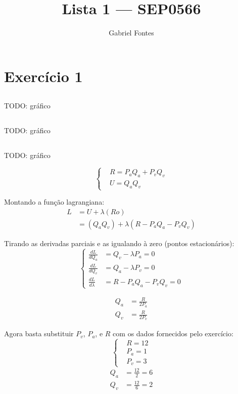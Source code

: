 \documentclass{article}
\title{Lista 1 --- SEP0566}
\author{Gabriel Fontes}
\begin{document}
\maketitle

\section{Exercício 1}
\subsection{}

TODO: gráfico

\subsection{}

TODO: gráfico

\subsection{}

TODO: gráfico

\[
	\left\{
	\begin{aligned}
		 & R = P_a Q_a + P_v Q_v \\
		 & U = Q_a Q_v
	\end{aligned}
	\right.
\]

Montando a função lagrangiana:
\[
	\begin{aligned}
		L & = U + \lambda(Ro)                            \\
		  & = (Q_a Q_v) + \lambda(R - P_a Q_a - P_v Q_v)
	\end{aligned}
\]

Tirando as derivadas parciais e as igualando à zero (pontos estacionários):
\[
	\left\{
	\begin{aligned}
		\frac{dL}{dQ_a}     & = Q_v - \lambda P_a = 0     \\
		\frac{dL}{dQ_v}     & = Q_a - \lambda P_v = 0     \\
		\frac{dL}{d\lambda} & = R - P_a Q_a - P_v Q_v = 0
	\end{aligned}
	\right.
\]

\[
	\begin{aligned}
		Q_a & = \frac{R}{2P_a} \\
		Q_v & = \frac{R}{2P_v}
	\end{aligned}
\]

Agora basta substituir \(P_v\), \(P_a\), e \(R\) com os dados fornecidos pelo
exercício:
\[
	\left\{
	\begin{aligned}
		 & R = 12  \\
		 & P_a = 1 \\
		 & P_v = 3
	\end{aligned}
	\right.
\]
\[
	\begin{aligned}
		Q_a & = \frac{12}{2} = 6 \\
		Q_v & = \frac{12}{6} = 2
	\end{aligned}
\]
\end{document}

